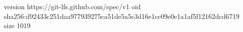 version https://git-lfs.github.com/spec/v1
oid sha256:d92433c251daa977939275ca51de5a5c3d16e1cc09e0e1a1af5f12162dcd6719
size 1019
